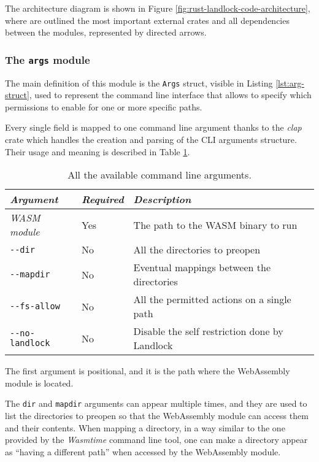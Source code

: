 \clearpage
The architecture diagram is shown in Figure \ref{fig:rust-landlock-code-architecture}, where
are outlined the most important external crates and all dependencies between the modules, represented
by directed arrows.

\subsubsection{The \texttt{args} module}
\label{sec:landlock-args-module}

The main definition of this module is the \texttt{Args} struct, visible in Listing \ref{lst:arg-struct},
used to represent the command line interface that allows to specify which permissions to enable
for one or more specific paths.

Every single field is mapped to one command line argument thanks to the \textit{clap} crate which handles the
creation and parsing of the CLI arguments structure.
Their usage and meaning is described in Table \ref{table:landlock-cli-args}.

\begin{table}
  \centering
  \begin{tabular}{|l|l|l|l|}
    \hline
    \textit{Argument} & \textit{Required} & \textit{Description} \\
    \hline\hline
    \textit{WASM module} & Yes & The path to the WASM binary to run \\ \hline
    \texttt{-{}-dir} & No & All the directories to preopen \\ \hline
    \texttt{-{}-mapdir} & No & Eventual mappings between the directories \\ \hline
    \texttt{-{}-fs-allow} & No & All the permitted actions on a single path \\ \hline
    \texttt{-{}-no-landlock} & No & Disable the self restriction done by Landlock \\
    \hline
  \end{tabular}
  \caption{All the available command line arguments.}
  \label{table:landlock-cli-args}
\end{table}

The first argument is positional, and it is the path where the WebAssembly module is located.

The \texttt{dir} and \texttt{mapdir} arguments can appear multiple times, and they are used to list the directories to preopen
so that the WebAssembly module can access them and their contents.
When mapping a directory, in a way similar to the one provided by the \textit{Wasmtime} command line tool, one can make a
directory appear as ``having a different path'' when accessed by the WebAssembly module.

